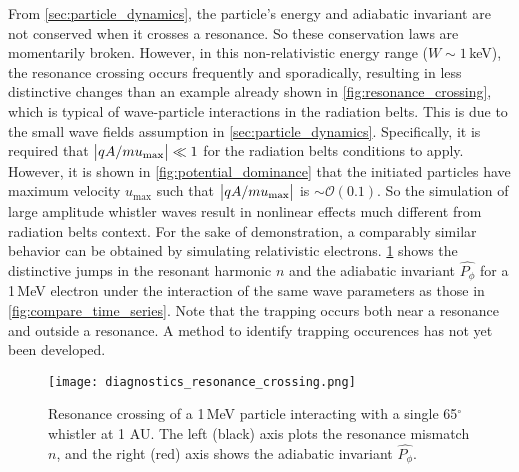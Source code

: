 From \cref{sec:particle_dynamics}, the particle's energy and
adiabatic invariant are not conserved when it crosses a resonance. So these
conservation laws are momentarily broken. However, in this non-relativistic
energy range ($W\sim1$\,\si{keV}), the resonance crossing occurs frequently and
sporadically, resulting in less distinctive changes than an example already
shown in \cref{fig:resonance_crossing}, which is typical of wave-particle interactions in the radiation belts. This is due to the small wave fields assumption in \cref{sec:particle_dynamics}. Specifically, it is required
that $\abs{qA/mu_{\max}}\ll 1$ for the radiation belts conditions to
apply. However, it is shown in
\cref{fig:potential_dominance}  that the initiated particles have maximum 
velocity $u_{\max}$ such that $\abs{qA/mu_{\max}}$ is $\sim\mathcal{O}(0.1)$. 
So the simulation of large amplitude whistler waves result in nonlinear effects 
much different from radiation belts context. For the sake of demonstration, a 
comparably similar behavior can be obtained by simulating relativistic 
electrons. \cref{fig:relativistic_resonance_crossing} shows the distinctive 
jumps in the resonant harmonic $n$ and the adiabatic invariant $\hat{P_\phi}$ 
for a 1\,\si{MeV} electron under the interaction of the same wave parameters as 
those in \cref{fig:compare_time_series}. Note that the trapping occurs both 
near a resonance and outside a resonance. A method to identify trapping
occurences has not yet been developed.

\begin{figure}[hbtp]
    \centering
    \texttt{[image: diagnostics\_resonance\_crossing.png]}
    \caption{Resonance crossing of a 1\,\si{MeV} particle interacting with a
    single 65$^\circ$ whistler at 1 AU. The left (black) axis plots the
resonance mismatch $n$, and the right (red) axis shows the adiabatic invariant
$\hat{P_\phi}$.}
    \label{fig:relativistic_resonance_crossing}
\end{figure}

